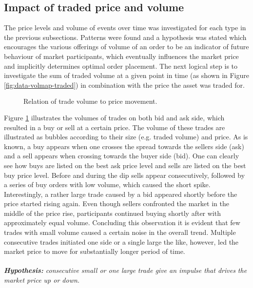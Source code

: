 \subsection{Impact of traded price and volume}

The price levels and volume of events over time was investigated for each type in the previous subsections.
Patterns were found and a hypothesis was stated which encourages the various offerings of volume of an order to be an indicator of future behaviour of market participants, which eventually influences the market price and implicitly determines optimal order placement.
The next logical step is to investigate the sum of traded volume at a given point in time (as shown in Figure \ref{fig:data-volmap-traded}) in combination with the price the asset was traded for.

\begin{figure}[H]
    \centering
    \caption{Relation of trade volume to price movement.}
    \label{fig:data-trade-volume}
\end{figure}

Figure \ref{fig:data-trade-volume} illustrates the volumes of trades on both bid and ask side, which resulted in a buy or sell at a certain price.
The volume of these trades are illustrated as bubbles according to their size (e.g. traded volume) and price.
As is known, a buy appears when one crosses the spread towards the sellers side (ask) and a sell appears when crossing towards the buyer side (bid).
One can clearly see how buys are listed on the best ask price level and sells are listed on the best buy price level.
Before and during the dip sells appear consecutively, followed by a series of buy orders with low volume, which caused the short spike.
Interestingly, a rather large trade caused by a bid appeared shortly before the price started rising again.
Even though sellers confronted the market in the middle of the price rise, participants continued buying shortly after with approximately equal volume.
Concluding this observation it is evident that few trades with small volume caused a certain noise in the overall trend.
Multiple consecutive trades initiated one side or a single large the like, however, led the market price to move for substantially longer period of time.
\\
\\
\textit{\textbf{Hypothesis:} consecutive small or one large trade give an impulse that drives the market price up or down.}


